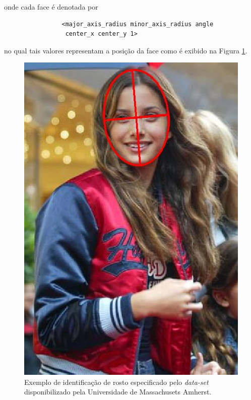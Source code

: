 \documentclass[10pt, conference]{IEEEtran}
\begin{document}
			onde cada face é denotada por

			\begin{verbatim}
				<major_axis_radius minor_axis_radius angle
				 center_x center_y 1>
			\end{verbatim}

			no qual tais valores representam a posição da face como é exibido na Figura \ref{fig:mulher}.

			\begin{figure}[H]
				\centering
				\includegraphics[width=0.75\linewidth]{img/data_set.jpg}
				\caption{Exemplo de identificação de rosto especificado pelo \textit{data-set} disponibilizado pela Universidade de Massachusets Amherst.}
				\label{fig:mulher}
			\end{figure}

\iffinal

\fi










\end{document}
